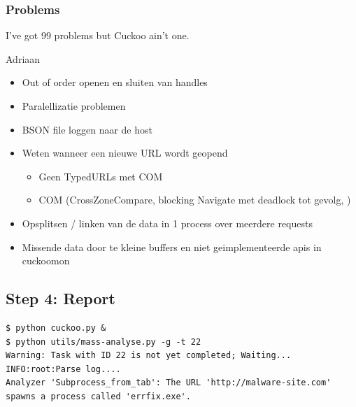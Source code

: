 \subsubsection{Problems}
\label{99problems}
\epigraph{I've got 99 problems but Cuckoo ain't one.}{Adriaan}

\begin{itemize}
\item Out of order openen en sluiten van handles 
\item Paralellizatie problemen
\item BSON file loggen naar de host
\item Weten wanneer een nieuwe URL wordt geopend
\begin{itemize}
\item Geen TypedURLs met COM
\item COM (CrossZoneCompare, blocking Navigate met deadlock tot gevolg, )
\end{itemize}
\item Opsplitsen / linken van de data in 1 process over meerdere requests
\item Missende data door te kleine buffers en niet geimplementeerde apis in cuckoomon
\end{itemize}

\subsection{Step 4: Report}
\begin{lstlisting}
$ python cuckoo.py &
$ python utils/mass-analyse.py -g -t 22
Warning: Task with ID 22 is not yet completed; Waiting...
INFO:root:Parse log....
Analyzer 'Subprocess_from_tab': The URL 'http://malware-site.com' 
spawns a process called 'errfix.exe'.
\end{lstlisting}

